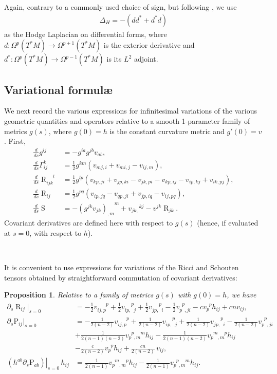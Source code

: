 \documentclass[10pt,reqno]{amsart}
\newtheorem{prop}[theorem]{Proposition}
\DeclareMathOperator{\Rc}{R}
\renewcommand{\P}{\mathrm{P}}
\DeclareMathOperator{\Scal}{S}
\DeclareMathOperator{\R}{R}
\newcommand{\riem}{\R}
\newcommand{\riemdddu}[4]{\riem^{\phantom{#1 #2 #3} #4}_{#1 #2 #3}}
\newcommand{\vdu}[2]{v_{#1}^{\phantom{#1} #2}}
\newcommand{\vdddu}[4]{v_{#1 #2, #3}^{\phantom{#1#2,#3} #4}}
\newcommand{\vddud}[4]{v_{#1 #2, \phantom{#3} #4}^{\phantom{#1#2,} #3 \phantom{#4}}}
\newcommand{\vdudd}[4]{v_{#1 \phantom{#2}, #3 #4}^{\phantom{#1} #2 \phantom{, #3 #4}}}
\newcommand{\vdudu}[4]{v_{#1 \phantom{#2}, #3 \phantom{#4}}^{\phantom{#1} #2 \phantom{, #3} #4}}
\newcommand{\varChr}[4]{ \frac{1}{2} g^{#3 #4} \left(  v_{#4 #2,#1} +  v_{#4 #1,#2} -  v_{#1 #2,#4} \right) }
\begin{document}
Again, contrary to a commonly used choice of sign, but following \cite{CLN}, we use
\begin{align*}
\Delta_H = -(d d^* + d^* d)
\end{align*}
as the Hodge Laplacian on differential forms, where $d:\Omega^p(T^*M) \rightarrow \Omega^{p+1}(T^*M)$ is the exterior derivative and $d^*: \Omega^p(T^*M)  \rightarrow \Omega^{p-1}(T^*M)$ is its $L^2$ adjoint. 

\subsection{Variational formul\ae }
We next record the various expressions for infinitesimal variations of the various geometric quantities and operators relative to a smooth 1-parameter family of metrics $g(s)$,
where $g(0) = h$ is the constant curvature metric and $g'(0) = v$.  First, 
\begin{align} 
\frac{d}{ds} g^{ij} &= -g^{ia} g^{jb} v_{ab}, \\
\frac{d}{ds} \Gamma_{ij}^k &=  \varChr{i}{j}{k}{m}, \label{eqn:var-christoffel} \\
\frac{d}{ds} \riemdddu{i}{j}{k}{l} &= \frac{1}{2} g^{lp} \left( v_{kp,ji} + v_{jp,ki} - v_{jk,pi} - v_{kp,ij} - v_{ip,kj} + v_{ik,pj} \right),\\
\frac{d}{ds} \Rc_{ij}  &= \frac{1}{2} g^{pq} \left(  v_{ip,jq} - v_{qp,ji} +  v_{jp,iq} -  v_{ij,pq} \right), \label{eqn:varRicci} \\
\frac{d}{ds} \Scal &= - {(g^{jk} v_{jk})_{,m}}^m + {v_{jk,}}^{kj} - v^{jk} \Rc_{jk}. \label{eqn:var-scal-curv}
\end{align}
Covariant derivatives are defined here with respect to $g(s)$ (hence, if evaluated at $s=0$, with respect to $h$). 

\

It is convenient to use expressions for variations of the Ricci and Schouten tensors obtained by straightforward commutation of covariant derivatives: 
\begin{prop} \label{prop:var-basic-curv}
Relative to a family of metrics $g(s)$ with $g(0) = h$, we have
\begin{align*}
	\partial_s \Rc_{ij} |_{s=0}	&= -\frac{1}{2} \vdddu{i}{j}{p}{p}  + \frac{1}{2} \vddud{i}{p}{p}{j}  + \frac{1}{2} \vddud{j}{p}{p}{i}  - \frac{1}{2} \vdudd{p}{p}{j}{i} - c \vdu{p}{p} h_{ij} + c n v_{ij},\\
	\partial_s \P_{ij}|_{s=0} &= -\frac{1}{2(n-2)} \vdddu{i}{j}{p}{p} + \frac{1}{2(n-2)} \vddud{i}{p}{p}{j}  + \frac{1}{2(n-2)} \vddud{j}{p}{p}{i} - \frac{1}{2(n-2)} \vdudd{p}{p}{j}{i}  \nonumber \\
	&+\frac{1}{2(n-1)(n-2)} \vdudu{p}{p}{m}{m} h_{ij} - \frac{1}{2(n-1)(n-2)} \vdudu{p}{m}{m}{p} h_{ij} \\
	&- \frac{c}{2(n-2)} \vdu{p}{p} h_{ij} + \frac{cn}{2(n-2)} \, v_{ij},\nonumber \\
	\left. \left( h^{ab} \partial_s \P_{ab} \right) \right|_{s=0}  \, h_{ij}
	&= \frac{1}{2(n-1)} \vdudu{p}{m}{m}{p}  h_{ij} - \frac{1}{2(n-1)} \vdudu{p}{p}{m}{m} h_{ij}. 
	\end{align*}
\end{prop}
\end{document}
